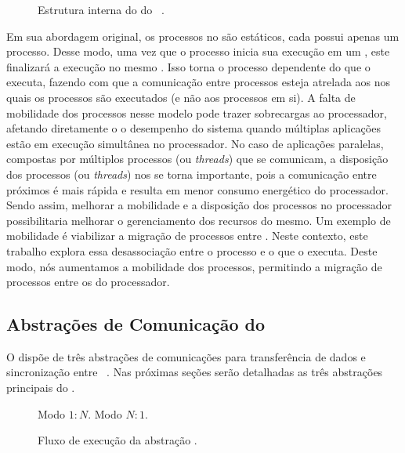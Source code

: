 \begin{figure}[t]
    \centering
    
    \caption{Estrutura interna do \microkernel do \nanvix~\cite{penna:thesis}.}
    \label{fig.microkernel-overview}
\end{figure}

Em sua abordagem original, os processos no \nanvix são estáticos, \ie cada \cluster possui apenas um processo. Desse modo, uma vez que o processo inicia sua execução em um \cluster, este finalizará a execução no mesmo \cluster. 
Isso torna o processo dependente do \cluster que o executa, fazendo com que a comunicação entre processos esteja atrelada aos \clusters nos quais os processos são executados (e não aos processos em si). A falta de mobilidade dos processos nesse modelo pode trazer sobrecargas ao processador, afetando diretamente o o desempenho do sistema quando múltiplas aplicações estão em execução simultânea no processador. No caso de aplicações paralelas, compostas por múltiplos processos (ou \textit{threads}) que se comunicam, a disposição dos processos (ou \textit{threads}) nos \clusters se torna importante, pois a comunicação entre \clusters próximos é mais rápida e resulta em menor consumo energético do processador. Sendo assim, melhorar a mobilidade e a disposição dos processos no processador possibilitaria melhorar o gerenciamento dos recursos do mesmo. Um exemplo de mobilidade é viabilizar a migração de processos entre \clusters. Neste contexto, este trabalho explora essa desassociação entre o processo e o \cluster que o executa. Deste modo, nós aumentamos a mobilidade dos processos, permitindo a migração de processos entre os \clusters do processador.

\subsection{Abstrações de Comunicação do \nanvix}

O \nanvix dispõe de três abstrações de comunicações para transferência de dados e sincronização entre \clusters~\cite{penna:thesis}. Nas próximas seções serão detalhadas as três abstrações principais do \nanvix.

\begin{figure}[tb]
	\centering
                   {Modo $1:N$.}
                   {}
	\qquad
                   {Modo $N:1$.}
                   {}
	\caption{Fluxo de execução da abstração \sync \cite{penna:thesis}.\label{fig.sync}}
\end{figure}

